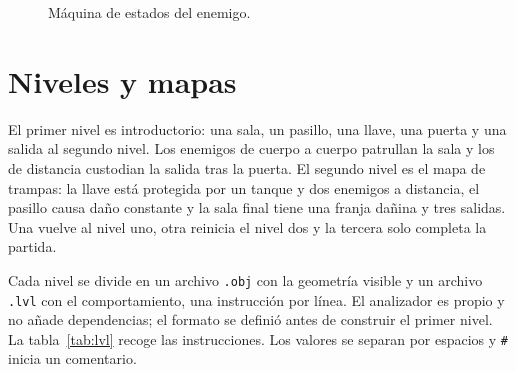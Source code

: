 \documentclass[12pt,a4paper]{article}
\begin{document}
\begin{figure}[htbp]
  \centering
  \caption{Máquina de estados del enemigo.}
  \label{fig:fsm}
\end{figure}

\section{Niveles y mapas}

El primer nivel es introductorio: una sala, un pasillo, una llave, una puerta y
una salida al segundo nivel. Los enemigos de cuerpo a cuerpo patrullan la sala y
los de distancia custodian la salida tras la puerta. El segundo nivel es el mapa
de trampas: la llave está protegida por un tanque y dos enemigos a distancia, el
pasillo causa daño constante y la sala final tiene una franja dañina y tres
salidas. Una vuelve al nivel uno, otra reinicia el nivel dos y la tercera solo
completa la partida.

Cada nivel se divide en un archivo \texttt{.obj} con la geometría visible y un
archivo \texttt{.lvl} con el comportamiento, una instrucción por línea. El
analizador es propio y no añade dependencias; el formato se definió antes de
construir el primer nivel. La tabla~\ref{tab:lvl} recoge las instrucciones. Los valores se separan por espacios
y \texttt{\#} inicia un comentario.
\end{document}

